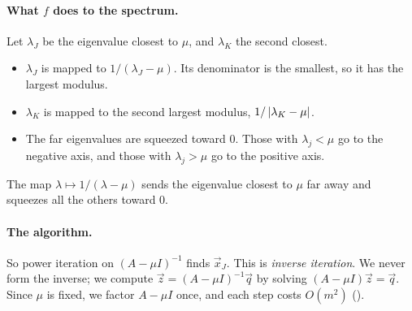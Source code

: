 \paragraph{What $f$ does to the spectrum.} Let $\lambda_J$ be the eigenvalue closest to $\mu$, and $\lambda_K$ the second closest.
\begin{itemize}
  \item $\lambda_J$ is mapped to $1/(\lambda_J - \mu)$. Its denominator is the smallest, so it has the largest modulus.
  \item $\lambda_K$ is mapped to the second largest modulus, $1/\left\lvert \lambda_K - \mu \right\rvert$.
  \item The far eigenvalues are squeezed toward $0$. Those with $\lambda_j < \mu$ go to the negative axis, and those with $\lambda_j > \mu$ go to the positive axis.
\end{itemize}

\begin{center}

\small The map $\lambda \mapsto 1/(\lambda - \mu)$ sends the eigenvalue closest to $\mu$ far away and squeezes all the others toward $0$.
\end{center}

\paragraph{The algorithm.} So power iteration on $(A - \mu I)^{-1}$ finds $\vec{x}_J$. This is \emph{inverse iteration}. We never form the inverse; we compute $\vec{z} = (A - \mu I)^{-1}\vec{q}$ by solving $(A - \mu I)\vec{z} = \vec{q}$. Since $\mu$ is fixed, we factor $A - \mu I$ once, and each step costs $O(m^2)$ ().

